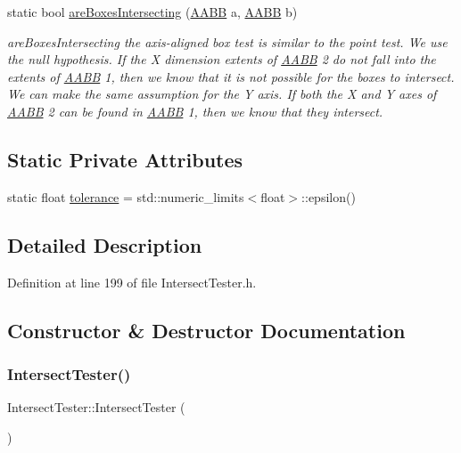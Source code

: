 \begin{DoxyCompactItemize}
static bool \hyperlink{class_intersect_tester_aff69bf4a84e714029204496c2efb0b3b}{are\+Boxes\+Intersecting} (\hyperlink{class_a_a_b_b}{A\+A\+BB} a, \hyperlink{class_a_a_b_b}{A\+A\+BB} b)
\begin{DoxyCompactList}\small\item\em are\+Boxes\+Intersecting the axis-\/aligned box test is similar to the point test. We use the null hypothesis. If the X dimension extents of \hyperlink{class_a_a_b_b}{A\+A\+BB} 2 do not fall into the extents of \hyperlink{class_a_a_b_b}{A\+A\+BB} 1, then we know that it is not possible for the boxes to intersect. We can make the same assumption for the Y axis. If both the X and Y axes of \hyperlink{class_a_a_b_b}{A\+A\+BB} 2 can be found in \hyperlink{class_a_a_b_b}{A\+A\+BB} 1, then we know that they intersect. \end{DoxyCompactList}\end{DoxyCompactItemize}
\subsection*{Static Private Attributes}
\begin{DoxyCompactItemize}
\item 
static float \hyperlink{class_intersect_tester_a50c5d2e177394644ceee23c700a541fd}{tolerance} = std\+::numeric\+\_\+limits$<$float$>$\+::epsilon()
\end{DoxyCompactItemize}


\subsection{Detailed Description}


Definition at line 199 of file Intersect\+Tester.\+h.



\subsection{Constructor \& Destructor Documentation}
\mbox{\label{class_intersect_tester_a2c6c76bd440dde9b8d158b4c37b174f8}} 
\subsubsection{\texorpdfstring{Intersect\+Tester()}{IntersectTester()}}
{\footnotesize\ttfamily Intersect\+Tester\+::\+Intersect\+Tester (\begin{DoxyParamCaption}{ }\end{DoxyParamCaption})}



